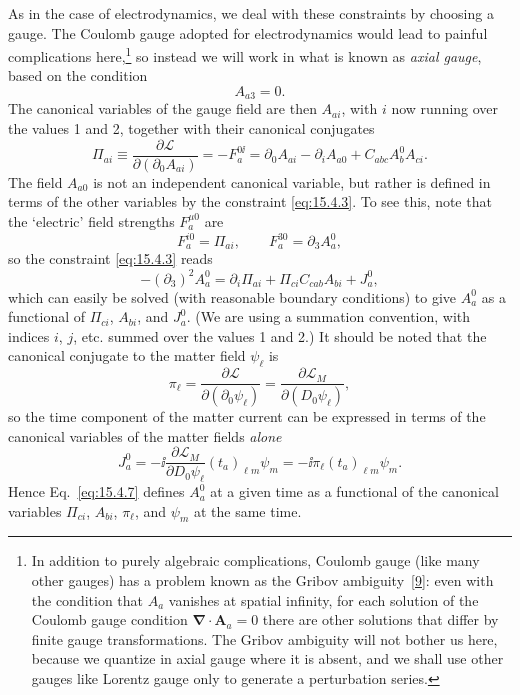 As in the case of electrodynamics, we deal with these constraints by choosing
a gauge. The Coulomb gauge adopted for electrodynamics would lead to painful
complications here,\footnote{In addition to purely algebraic complications,
Coulomb gauge (like many other gauges) has a problem known as the Gribov
ambiguity~\hyperref[ch15-ref-9]{[9]}: even with the condition that $A_a$
vanishes at spatial infinity, for each solution of the Coulomb gauge condition
$\boldsymbol\nabla\cdot\mathbf A_a=0$ there are other solutions that differ
by finite gauge transformations. The Gribov ambiguity will not bother us here,
because we quantize in axial gauge where it is absent, and we shall use other
gauges like Lorentz gauge only to generate a perturbation series.} so instead
we will work in what is known as \emph{axial gauge}, based on the condition
\begin{equation}
  A_{a3}=0.
  \tag{15.4.4}\label{eq:15.4.4}
\end{equation}
The canonical variables of the gauge field are then $A_{a i}$, with $i$
now running over the values 1 and 2, together with their canonical conjugates
\begin{equation}
  \Pi_{a i}\equiv\frac{\partial\mathcal L}
  {\partial(\partial_0A_{a i})}=-F_a^{0\ii}
  =\partial_0A_{a i}-\partial_iA_{a0}
  +C_{abc}A_b^0A_{c i}.
  \tag{15.4.5}\label{eq:15.4.5}
\end{equation}
The field $A_{a0}$ is not an independent canonical variable, but rather
is defined in terms of the other variables by the constraint \eqref{eq:15.4.3}.
To see this, note that the `electric' field strengths $F_a^{\mu0}$ are
\begin{equation}
  F_a^{i0}=\Pi_{a i},
  \qquad F_a^{30}=\partial_3A_a^0,
  \tag{15.4.6}\label{eq:15.4.6}
\end{equation}
so the constraint \eqref{eq:15.4.3} reads
\begin{equation}
  -(\partial_3)^2A_a^0
  =\partial_i\Pi_{a i}
  +\Pi_{c i}C_{cab}A_{b i}+J_a^0,
  \tag{15.4.7}\label{eq:15.4.7}
\end{equation}
which can easily be solved (with reasonable boundary conditions) to give
$A_a^0$ as a functional of $\Pi_{c i}$, $A_{b i}$, and
$J_a^0$. (We are using a summation convention, with indices $i$, $j$,
etc. summed over the values 1 and 2.) It should be noted that the canonical
conjugate to the matter field $\psi_\ell$ is
\begin{equation}
  \pi_\ell=\frac{\partial\mathcal L}{\partial(\partial_0\psi_\ell)}
  =\frac{\partial\mathcal L_M}{\partial(D_0\psi_\ell)},
  \tag{15.4.8}\label{eq:15.4.8}
\end{equation}
so the time component of the matter current can be expressed in terms of the
canonical variables of the matter fields \emph{alone}
\begin{equation}
  J_a^0=-\ii\frac{\partial\mathcal L_M}{\partial D_0\psi_\ell}
  (t_a)_{\ell m}\psi_m
  =-\ii\pi_\ell(t_a)_{\ell m}\psi_m.
  \tag{15.4.9}\label{eq:15.4.9}
\end{equation}
Hence Eq.~\eqref{eq:15.4.7} defines $A_a^0$ at a given time as a
functional of the canonical variables $\Pi_{c i}$, $A_{b i}$,
$\pi_\ell$, and $\psi_m$ at the same time.

